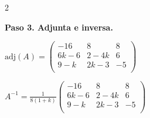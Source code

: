 \begin{prob}
\begin{enumerate}[$a)$]
\begin{myproof}
\begin{multicols}{2}
\begin{table}[H]
\centering
{}
\caption{Cofactores de la tercera fila}
\label{tab:cofactores_fila3}
\end{table}

\textbf{Paso 3. Adjunta e inversa.}

$\text{adj}(A) = \left( \begin{array}{ccc}
-16&8&8\\
6k-6&2-4k&6\\
9-k&2k-3&-5\\
\end{array} \right)$

$\boxed{A^{-1} = \frac{1}{8(1+k)} \left( \begin{array}{ccc}
-16&8&8\\
6k-6&2-4k&6\\
9-k&2k-3&-5\\
\end{array} \right)}$
\end{multicols}
\end{myproof}
\end{enumerate}
\end{prob}


